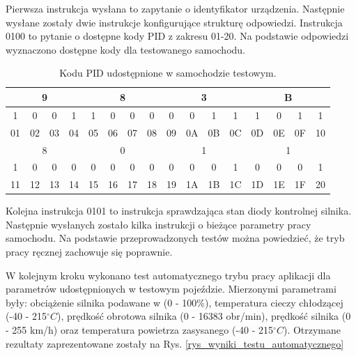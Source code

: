 \documentclass[12pt, twoside]{article} %
\numberwithin{equation}{subsection}
\numberwithin{figure}{section}
\numberwithin{table}{section}
\begin{document}
		Pierwsza instrukcja wysłana to zapytanie o identyfikator urządzenia. Następnie wysłane zostały dwie instrukcje konfigurujące strukturę odpowiedzi. Instrukcja 0100 to pytanie o dostępne kody PID z zakresu 01-20. Na podstawie odpowiedzi wyznaczono dostępne kody dla testowanego samochodu.
		
\begin{table}[!h]
\centering
\caption{Kodu PID udostępnione w samochodzie testowym.}
\label{tabela_test_pids}
\begin{tabular}{|c|c|c|c|c|c|c|c|c|c|c|c|c|c|c|c|}
\hline
\multicolumn{4}{|c|}{9} & \multicolumn{4}{c|}{8} & \multicolumn{4}{c|}{3} & \multicolumn{4}{c|}{B} \\ \hline
1    & 0    & 0   & 1   & 1    & 0   & 0   & 0   & 0    & 0   & 1   & 1   & 1    & 0   & 1   & 1   \\ \hline
01   & 02   & 03  & 04  & 05   & 06  & 07  & 08  & 09   & 0A  & 0B  & 0C  & 0D   & 0E  & 0F  & 10  \\ \hline \hline
\multicolumn{4}{|c|}{8} & \multicolumn{4}{c|}{0} & \multicolumn{4}{c|}{1} & \multicolumn{4}{c|}{1} \\ \hline
1    & 0    & 0   & 0   & 0    & 0   & 0   & 0   & 0    & 0   & 0   & 1   & 0    & 0   & 0   & 1   \\ \hline
11   & 12   & 13  & 14  & 15   & 16  & 17  & 18  & 19   & 1A  & 1B  & 1C  & 1D   & 1E  & 1F  & 20  \\ \hline
\end{tabular}
\end{table}

	
	
	\newpage
	
	Kolejna instrukcja 0101 to instrukcja sprawdzająca stan diody kontrolnej silnika. Następnie wysłanych zostało kilka instrukcji o bieżące parametry pracy samochodu. Na podstawie przeprowadzonych testów można powiedzieć, że tryb pracy ręcznej zachowuje się poprawnie.	
	
	W kolejnym kroku wykonano test automatycznego trybu pracy aplikacji dla parametrów udostępnionych w testowym pojeździe. Mierzonymi parametrami były: obciążenie silnika podawane w (0 - 100\%), temperatura cieczy chłodzącej (-40 - 215${}^\circ C$), prędkość obrotowa silnika (0 - 16383 obr/min), prędkość silnika (0 - 255 km/h) oraz temperatura powietrza zasysanego (-40 - 215${}^\circ C$). Otrzymane rezultaty zaprezentowane zostały na Rys. \ref{rys_wyniki_testu_automatycznego}
	
\end{document}
